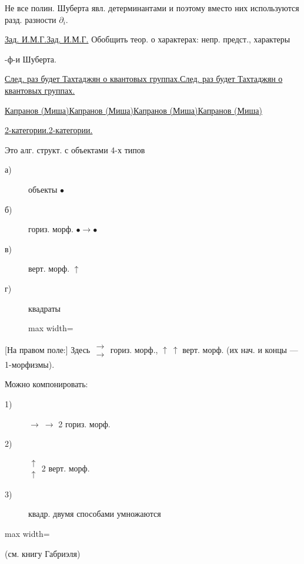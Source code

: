 \documentclass[11pt]{article}
\theoremstyle{definition}
\theoremstyle{remark}
\newcommand{\Unclear}[3]{%
  \begingroup\color{orange!70!black}%
  [Unresolved reading #1/#2: #3]\endgroup%
}
\renewcommand{\Unclear}[3]{%
  \begingroup\color{orange!65!black}%
  \ifmmode\text{[неясно: #3]}\else[неясно: #3]\fi\endgroup%
}
\let\DiplomaticMathUnderline\underline
\renewcommand{\underline}[1]{\ifmmode\DiplomaticMathUnderline{#1}\else\uline{#1}\fi}
\begin{document}
Не все полин. Шуберта явл. детерминантами и поэтому вместо
них используются разд. разности $\partial_i$.

\underline{Зад. И.М.Г.} Обобщить теор. о характерах: непр. предст., характеры
\Unclear{GELFAND-P001405}{characters-line-ending}{с-…-}
-ф-и Шуберта.

\underline{След. раз будет Тахтаджян о квантовых группах.}

\underline{\underline{Капранов (Миша)}}

\underline{2-категории.}

Это алг. структ. с объектами 4-х типов
\begin{description}
\item[а)] объекты $\bullet$
\item[б)] гориз. морф. $\bullet\longrightarrow\bullet$
\item[в)] верт. морф. $\uparrow$
\item[г)] квадраты
\begin{adjustbox}{max width=\linewidth}
\end{adjustbox}
\end{description}

[На правом поле:]
Здесь $\begin{matrix}\longrightarrow\\\longrightarrow\end{matrix}$ гориз. морф.,
$\uparrow\ \uparrow$ верт. морф.
(их нач. и концы — 1-морфизмы).

Можно компонировать:
\begin{description}
\item[1)] $\longrightarrow\ \longrightarrow$ 2 гориз. морф.
\item[2)] $\begin{matrix}\uparrow\\\uparrow\end{matrix}$ 2 верт. морф.
\item[3)] квадр. двумя способами умножаются
\end{description}
\begin{center}
\begin{adjustbox}{max width=\linewidth}
\end{adjustbox}
\end{center}
(см. книгу Габриэля)
\end{document}
